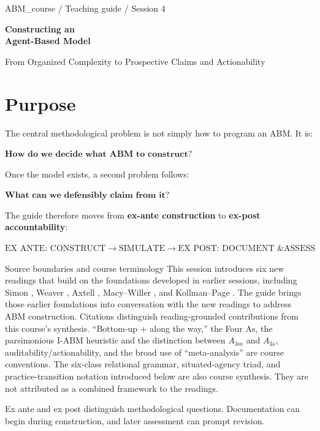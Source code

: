 \documentclass[11pt,a4paper]{article}
\newenvironment{fitdisplay}{\par\medskip\noindent\begin{lrbox}{\displaybox}$\displaystyle}{%
$\end{lrbox}\makebox[\linewidth][c]{\ifdim\wd\displaybox>\linewidth\resizebox{\linewidth}{!}{\usebox{\displaybox}}\else\usebox{\displaybox}\fi}\par\medskip}
\begin{document}
\thispagestyle{empty}
{\sffamily\color{teal}\large ABM\_course / Teaching guide / Session 4\par}
\vspace{7mm}
{\sffamily\bfseries\color{ink}\fontsize{28}{32}\selectfont Constructing an\\Agent-Based Model\par}
\vspace{4mm}
{\large From Organized Complexity to Prospective Claims and Actionability\par}
\vspace{5mm}

\section*{Purpose}

The central methodological problem is not simply how to program an ABM. It is:

\begin{fitdisplay}
\boxed{\textbf{How do we decide what ABM to construct?}}
\end{fitdisplay}

Once the model exists, a second problem follows:

\begin{fitdisplay}
\boxed{\textbf{What can we defensibly claim from it?}}
\end{fitdisplay}

The guide therefore moves from \textbf{ex-ante construction} to \textbf{ex-post accountability}:

\begin{fitdisplay}
\boxed{
\text{EX ANTE: CONSTRUCT}
\rightarrow
\text{SIMULATE}
\rightarrow
\text{EX POST: DOCUMENT \& ASSESS}
}
\end{fitdisplay}



\clearpage
\begin{principle}{Source boundaries and course terminology}
This session introduces six new readings that build on the foundations developed in earlier sessions, including Simon \cite{simon_behavioral_1955,simon}, Weaver \cite{weaver}, Axtell \cite{axtell_why_2000-1}, Macy--Willer \cite{macy_factors_2002}, and Kollman--Page \cite{kollman_chapter_2006}. The guide brings those earlier foundations into conversation with the new readings to address ABM construction. Citations distinguish reading-grounded contributions from this course's synthesis. ``Bottom-up + along the way,'' the Four As, the parsimonious I-ABM heuristic and the distinction between $A_{3m}$ and $A_{3s}$, auditability/actionability, and the broad use of ``meta-analysis'' are course conventions. The six-class relational grammar, situated-agency triad, and practice-transition notation introduced below are also course synthesis. They are not attributed as a combined framework to the readings.

Ex ante and ex post distinguish methodological questions. Documentation can begin during construction, and later assessment can prompt revision.
\end{principle}
\clearpage
\tableofcontents
\clearpage
\end{document}
